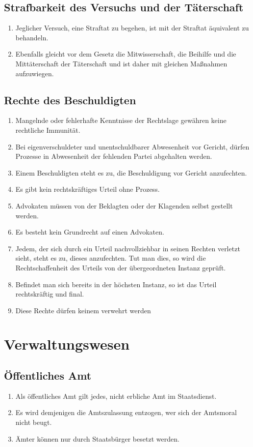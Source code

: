 \documentclass{article}
\begin{document}
\subsection{Strafbarkeit des Versuchs und der Täterschaft}
\begin{enumerate}
    \item Jeglicher Versuch, eine Straftat zu begehen, ist mit der Straftat äquivalent zu
    behandeln.
    \item Ebenfalls gleicht vor dem Gesetz die Mitwisserschaft, die Beihilfe und die
    Mittäterschaft der Täterschaft und ist daher mit gleichen Maßnahmen aufzuwiegen.
\end{enumerate}

\subsection{Rechte des Beschuldigten}\label{accusation}
\begin{enumerate}
    \item Mangelnde oder fehlerhafte Kenntnisse der Rechtslage gewähren keine rechtliche
    Immunität.
    \item Bei eigenverschuldeter und unentschuldbarer Abwesenheit vor Gericht, dürfen Prozesse
    in Abwesenheit der fehlenden Partei abgehalten werden.
    \item Einem Beschuldigten steht es zu, die Beschuldigung vor Gericht anzufechten.
    \item Es gibt kein rechtskräftiges Urteil ohne Prozess.
    \item Advokaten müssen von der Beklagten oder der Klagenden selbst gestellt werden.
    \item Es besteht kein Grundrecht auf einen Advokaten.
    \item Jedem, der sich durch ein Urteil nachvollziehbar in seinen Rechten verletzt sieht,
    steht es zu, dieses anzufechten. Tut man dies, so wird die Rechtschaffenheit des Urteils
    von der übergeordneten Instanz geprüft.
    \item Befindet man sich bereits in der höchsten Instanz, so ist das Urteil rechtskräftig
    und final.
    \item Diese Rechte dürfen keinem verwehrt werden
\end{enumerate}

\newpage
\section{Verwaltungswesen}
\subsection{Öffentliches Amt}
\begin{enumerate}
    \item Als öffentliches Amt gilt jedes, nicht erbliche Amt im Staatsdienst.
    \item Es wird demjenigen die Amtszulassung entzogen, wer sich der Amtsmoral nicht beugt.
    \item Ämter können nur durch Staatsbürger besetzt werden.
\end{enumerate}
\end{document}
